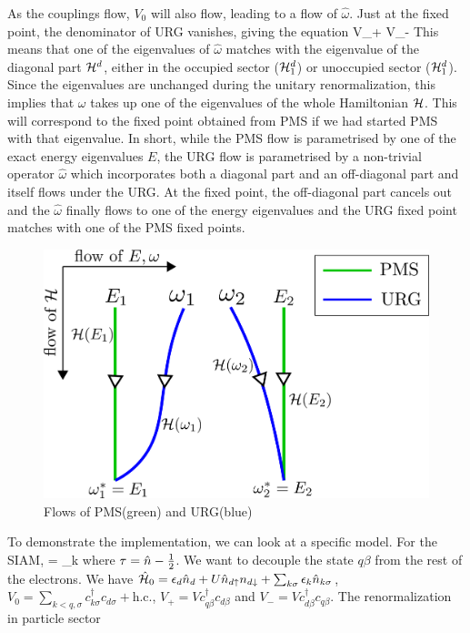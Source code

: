 \documentclass[12pt,twoside]{article}
\numberwithin{equation}{section}
\begin{document}
\pb As the couplings flow, \(V_0\) will also flow, leading to a flow of \(\hat\omega\). Just at the fixed point, the denominator of URG vanishes, giving the equation
\beq
{}V_+  V_-
\eeq
This means that one of the eigenvalues of \(\hat\omega\) matches with the eigenvalue of the diagonal part \(\mathcal{H}^d\), either in the occupied sector (\(\mathcal{H}^d_1\)) or unoccupied sector (\(\mathcal{H}^d_1\)). Since the eigenvalues are unchanged during the unitary renormalization, this implies that \(\omega\) takes up one of the eigenvalues of the whole Hamiltonian \(\mathcal{H}\). This will correspond to the fixed point obtained from PMS if we had started PMS with that eigenvalue.
\pb In short, while the PMS flow is parametrised by one of the exact energy eigenvalues \(E\), the URG flow is parametrised by a non-trivial operator \(\hat \omega\) which incorporates both a diagonal part and an off-diagonal part and itself flows under the URG. At the fixed point, the off-diagonal part cancels out and the \(\hat\omega\) finally flows to one of the energy eigenvalues and the URG fixed point matches with one of the PMS fixed points.
\begin{figure}
\centering
\includegraphics[scale=0.42]{pms_vs_urg.png}
\caption{Flows of PMS(green) and URG(blue)}
\end{figure}
\pb To demonstrate the implementation, we can look at a specific model. For the SIAM,
\beq
\ham = \sum_{k\sigma}
\eeq
where \(\tau = \hat n - \frac{1}{2}\). We want to decouple the state \(q\beta\) from the rest of the electrons. We have \(\hat{\mathcal{H}}_0 = \epsilon_d\hat n_d + U \hat n_{d\uparrow}n_{d\downarrow} + \sum_{k\sigma} \epsilon_k \hat n_{k\sigma}\), \(V_0 = \sum_{k<q,\sigma}c^\dagger_{k\sigma}c_{d\sigma}+\text{h.c.}\), \(V_+ = V c^\dagger_{q\beta}c_{d\beta}\) and \(V_- = V c^\dagger_{d\beta}c_{q\beta}\). The renormalization in particle sector
\end{document}
